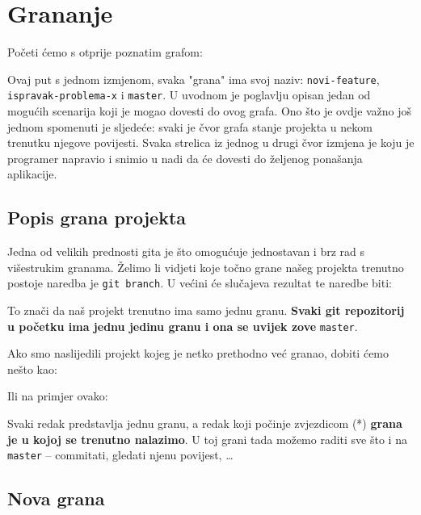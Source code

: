 \chapter*{Grananje}

Početi ćemo s otprije poznatim grafom:



Ovaj put s jednom izmjenom, svaka "grana" ima svoj naziv: \verb+novi-feature+, \\ \verb+ispravak-problema-x+ i \verb+master+.
U uvodnom je poglavlju opisan jedan od mogućih scenarija koji je mogao dovesti do ovog grafa.
Ono što je ovdje važno još jednom spomenuti je sljedeće: svaki je čvor grafa stanje projekta u nekom trenutku njegove povijesti. 
Svaka strelica iz jednog u drugi čvor izmjena je koju je programer napravio i snimio u nadi da će dovesti do željenog ponašanja aplikacije.

\section*{Popis grana projekta}

Jedna od velikih prednosti gita je što omogućuje jednostavan i brz rad s višestrukim granama.
Želimo li vidjeti koje točno grane našeg projekta trenutno postoje naredba je \verb+git branch+.
U većini će slučajeva rezultat te naredbe biti:



To znači da naš projekt trenutno ima samo jednu granu.
\textbf{Svaki git repozitorij u početku ima jednu jedinu granu i ona se uvijek zove} \verb+master+.

Ako smo naslijedili projekt kojeg je netko prethodno već granao, dobiti ćemo nešto kao:



Ili na primjer ovako:



Svaki redak predstavlja jednu granu, a redak koji počinje zvjezdicom (*) \textbf{grana je u kojoj se trenutno nalazimo}.
U toj grani tada možemo raditi sve što i na \verb+master+ -- commitati, gledati njenu povijest, \dots

\section*{Nova grana}

